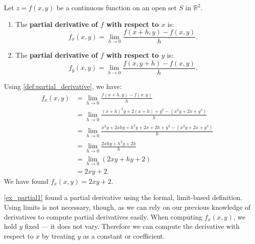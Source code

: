 {Let $z=f(x,y)$ be a continuous function on an open set $S$ in $\mathbb{R}^2$.
\begin{enumerate}
	\item The \textbf{partial derivative of $f$ with respect to $x$} is:
	\[f_x(x,y) = \lim_{h\to 0} \frac{f(x+h,y) - f(x,y)}h.\]
	\item The \textbf{partial derivative of $f$ with respect to $y$} is:
	\[f_y(x,y) = \lim_{h\to 0} \frac{f(x,y+h) - f(x,y)}h.\]
	
	\end{enumerate}
	}



{Using \autoref{def:partial_derivative}, we have:
\begin{align*}
f_x(x,y) &= \lim_{h\to 0} \frac{f(x+h,y) - f(x,y)}{h} \\
				&= \lim_{h\to 0} \frac{(x+h)^2y+2(x+h)+y^3 - (x^2y+2x+y^3)}{h}\\
				&= \lim_{h\to 0} \frac{x^2y+2xhy+h^2y+2x+2h+y^3-(x^2y+2x+y^3)}{h}\\
				&= \lim_{h\to 0} \frac{2xhy+h^2y+2h}{h}\\
				&=\lim_{h\to 0}(2xy+hy+2)\\
				&= 2xy+2.
\end{align*}
We have found $f_x(x,y) = 2xy+2$.}

\autoref{ex_partial1} found a partial derivative using the formal, limit-based definition. Using limits is not necessary, though, as we can rely on our previous knowledge of derivatives to compute partial derivatives easily. When computing $f_x(x,y)$, we hold $y$ fixed --- it does not vary. Therefore we can compute the derivative with respect to $x$ by treating $y$ as a constant or coefficient. 

